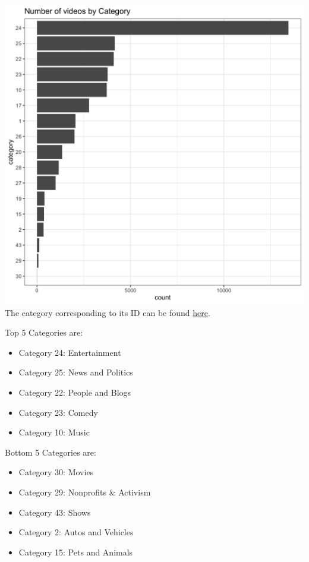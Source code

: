 \documentclass[]{article}
\providecommand{\tightlist}{%
  \setlength{\itemsep}{0pt}\setlength{\parskip}{0pt}}
\begin{document}
\includegraphics{../images/num_vids_category.png} The category
corresponding to its ID can be found
\href{https://developers.google.com/youtube/v3/docs/videoCategories/list}{here}.

Top 5 Categories are:

\begin{itemize}
\tightlist
\item
  Category 24: Entertainment
\item
  Category 25: News and Politics
\item
  Category 22: People and Blogs
\item
  Category 23: Comedy
\item
  Category 10: Music
\end{itemize}

Bottom 5 Categories are:

\begin{itemize}
\tightlist
\item
  Category 30: Movies
\item
  Category 29: Nonprofits \& Activism
\item
  Category 43: Shows
\item
  Category 2: Autos and Vehicles
\item
  Category 15: Pets and Animals
\end{itemize}
\end{document}
